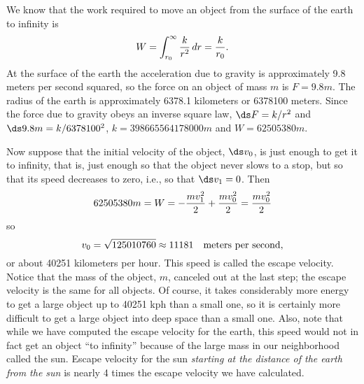 We know that the work required to move an object from the surface
of the earth to infinity is
$$W=\int_{r_0}^\infty {k\over r^2}\,dr={k\over r_0}.$$ 
At the surface of the earth the acceleration due
to gravity is approximately 9.8 meters per second squared, so the
force on an object of mass $m$ is $F=9.8m$. The radius of the earth is
approximately 6378.1 kilometers or 6378100 meters. Since the force due
to gravity obeys an inverse square law, $\ds F=k/r^2$ and
$\ds 9.8m=k/6378100^2$, $k= 398665564178000m$ and
$W=62505380 m$.

Now suppose that the initial velocity of the object, $\ds v_0$, is just
enough to get it to infinity, that is, just enough so that the object
never slows to a stop, but so that its speed decreases to zero, i.e., so
that $\ds v_1=0$. Then 
$$62505380 m=W=-{mv_1^2\over2}+{mv_0^2\over2}={mv_0^2\over2}$$
so
$$v_0=\sqrt{125010760}\approx 11181\quad\hbox{meters per second},$$
or about 40251 kilometers per hour. This speed is called the {\dfont
escape velocity\/}. Notice that the mass of
the object, $m$, canceled out at the last step; the escape velocity
is the same for all objects. Of course, it takes considerably more
energy to get a large object up to 40251 kph than a small one, so it
is certainly more difficult to get a large object into deep space than
a small one. Also, note that while we have computed the escape
velocity for the earth, this speed would not in fact get an object
``to infinity'' because of the large mass in our neighborhood called
the sun. Escape velocity for the sun {\em starting at the distance of
the earth from the sun\/} is nearly 4 times the escape velocity we
have calculated.

